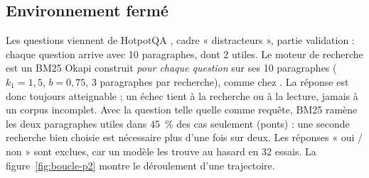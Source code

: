\subsection{Environnement fermé}

Les questions viennent de HotpotQA \citep{yang2018hotpotqa}, cadre « distracteurs », partie validation : chaque question arrive avec 10 paragraphes, dont 2 utiles. Le moteur de recherche est un BM25 Okapi construit \emph{pour chaque question} sur ses 10 paragraphes ($k_1 = 1{,}5$, $b = 0{,}75$, 3 paragraphes par recherche), comme chez \citet{zhai2026does}. La réponse est donc toujours atteignable ; un échec tient à la recherche ou à la lecture, jamais à un corpus incomplet. Avec la question telle quelle comme requête, BM25 ramène les deux paragraphes utiles dans 45~\% des cas seulement (ponts) : une seconde recherche bien choisie est nécessaire plus d'une fois sur deux. Les réponses « oui / non » sont exclues, car un modèle les trouve au hasard en 32 essais. La figure~\ref{fig:boucle-p2} montre le déroulement d'une trajectoire.

